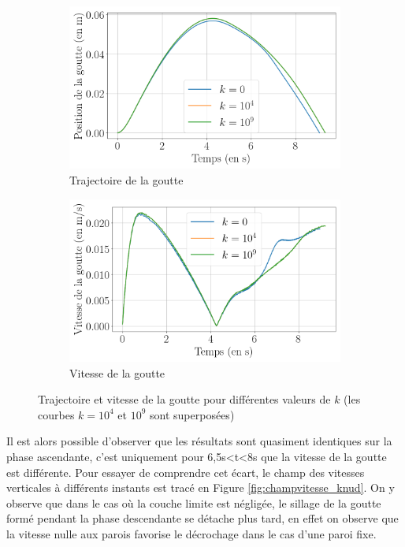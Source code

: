\begin{figure}[H] 
	\centering
	\begin{subfigure}[H]{0.47\textwidth}
		\centering
		\includegraphics[width=\textwidth]{figure/knudsen_influence_k_position.png}
		\caption{Trajectoire de la goutte}
		
	\end{subfigure} 
	\begin{subfigure}[H]{0.47\textwidth}
		\centering
		\includegraphics[width=\textwidth]{figure/knudsen_influence_k_vitesse.png}
		\caption{Vitesse de la goutte}
	\end{subfigure}
	\caption{Trajectoire et vitesse de la goutte pour différentes valeurs de $k$ (les courbes $k=10^4$ et $10^9$ sont superposées)}
	\label{fig:resultat_knudsen}
\end{figure}
Il est alors possible d'observer que les résultats sont quasiment identiques sur la phase ascendante, c'est uniquement pour 6,5s<t<8s que la vitesse de la goutte est différente. Pour essayer de comprendre cet écart, le champ des vitesses verticales à différents instants est tracé en Figure \ref{fig:champvitesse_knud}. On y observe que dans le cas où la couche limite est négligée, le sillage de la goutte formé pendant la phase descendante se détache plus tard, en effet on observe que la vitesse nulle aux parois favorise le décrochage dans le cas d'une paroi fixe.
